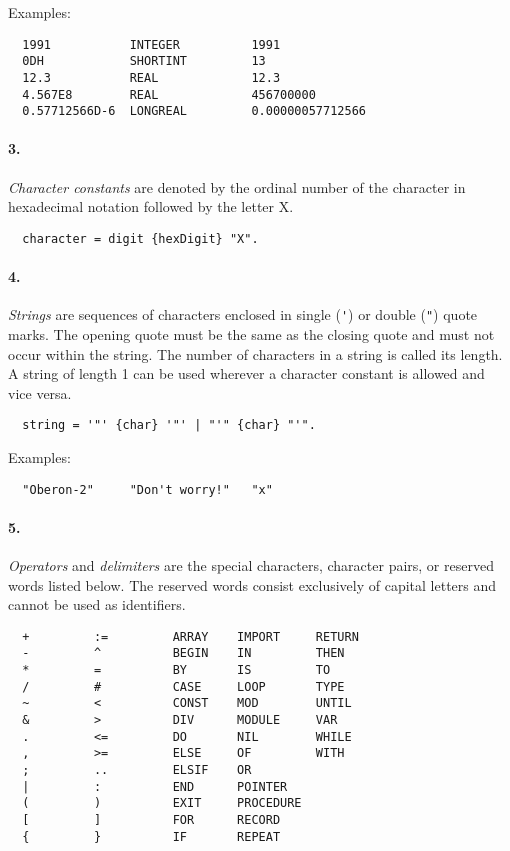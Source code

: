 \noindent
Examples:
\begin{verbatim}
  1991           INTEGER          1991
  0DH            SHORTINT         13
  12.3           REAL             12.3
  4.567E8        REAL             456700000
  0.57712566D-6  LONGREAL         0.00000057712566
\end{verbatim}

\paragraph{\rm 3.} {\em Character constants} are denoted by the ordinal
number of the character in hexadecimal notation followed by the letter
X.
{\BNFsize
\begin{verbatim}
  character = digit {hexDigit} "X".
\end{verbatim}}

\paragraph{\rm 4.} {\em Strings} are sequences of characters enclosed
in single (\verb|'|) or double (\verb|"|) quote marks.
The opening quote must be
the same as the closing quote and must not occur within the string.
The number of characters in a string is called its length. A string
of length 1 can be used wherever a character constant is allowed and
vice versa.
{\BNFsize
\begin{verbatim}
  string = '"' {char} '"' | "'" {char} "'".
\end{verbatim}}

\noindent
Examples:
\begin{verbatim}
  "Oberon-2"     "Don't worry!"   "x"
\end{verbatim}

\paragraph{\rm 5.} {\em Operators} and {\em delimiters} are the special
characters, character pairs, or reserved words listed below. The reserved
words consist exclusively of capital letters and cannot be used as
identifiers.
\begin{verbatim}
  +         :=         ARRAY    IMPORT     RETURN
  -         ^          BEGIN    IN         THEN
  *         =          BY       IS         TO
  /         #          CASE     LOOP       TYPE
  ~         <          CONST    MOD        UNTIL
  &         >          DIV      MODULE     VAR
  .         <=         DO       NIL        WHILE
  ,         >=         ELSE     OF         WITH
  ;         ..         ELSIF    OR
  |         :          END      POINTER
  (         )          EXIT     PROCEDURE
  [         ]          FOR      RECORD
  {         }          IF       REPEAT
\end{verbatim}

